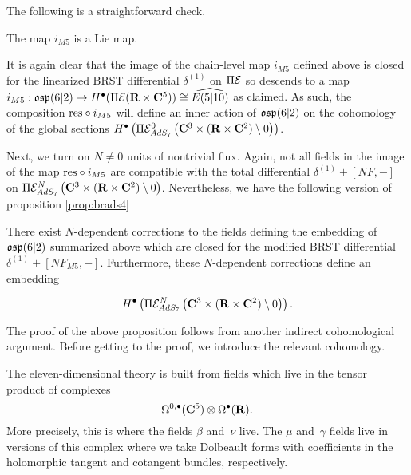 \documentclass[../main.tex]{subfiles}
\begin{document}
The following is a straightforward check.
\begin{lem}\label{lem:m5emb}
The map $i_{M5}$ is a Lie map.
\end{lem} 

It is again clear that the image of the chain-level map $i_{M5}$ defined above is closed for the linearized BRST differential $\delta^{(1)}$ on $\Pi \mathcal{E}$ so descends to a map $i_{M5} : \mathfrak{osp}(6|2) \to H^\bullet (\Pi \mathcal{E} (\mathbf{R}\times \mathbf{C}^5))\cong \widehat{E (5|10)}$ as claimed. As such, the composition $\mathrm{res}\circ i_{M5}$ will define an inner action of $\mathfrak{osp}(6|2)$ on the cohomology of the global sections $H^\bullet \left ( \Pi \mathcal{E}^{0}_{AdS_7} \left ( \mathbf{C}^3\times (\mathbf{R}\times \mathbf{C}^2)\setminus 0\right )\right )$. 

\parsec[]

Next, we turn on $N \ne 0$  units of nontrivial flux. Again, not all fields in the image of the map $\mathrm{res}\circ i_{M5}$ are compatible with the total differential $\delta^{(1)} + [N F, -]$ on $\Pi \mathcal{E}^{N}_{AdS_7} \left ( \mathbf{C}^3\times (\mathbf{R}\times \mathbf{C}^2)\setminus 0\right )$. Nevertheless, we have the following version of proposition \ref{prop:brads4}

\begin{prop}
\label{prop:brads7}
There exist $N$-dependent corrections to the fields defining the embedding of $\mathfrak{osp}(6|2)$ summarized above which are closed for the modified BRST differential $\delta^{(1)} + [N F_{M5},-]$. Furthermore, these $N$-dependent corrections define an embedding 

\[ H^\bullet \left ( \Pi \mathcal{E}^N_{AdS_7} \left ( \mathbf{C}^3 \times (\mathbf{R}\times \mathbf{C}^2)\setminus 0 \right ) \right). \]

\end{prop}

\iffalse
\parsec[s:thfcohomology]

The proof of the above proposition follows from another indirect cohomological argument. 
Before getting to the proof, we introduce the relevant cohomology. 

The eleven-dimensional theory is built from fields which live in the tensor product of complexes 
\[
\Omega^{0,\bullet}(\mathbf{C}^5) \otimes \Omega^\bullet(\mathbf{R}).
\]
More precisely, this is where the  fields $\beta$ and~$\nu$ live. 
The $\mu$ and~$\gamma$ fields live in versions of this complex where we take Dolbeault forms with coefficients in the holomorphic tangent and cotangent bundles, respectively. 
\end{document}
